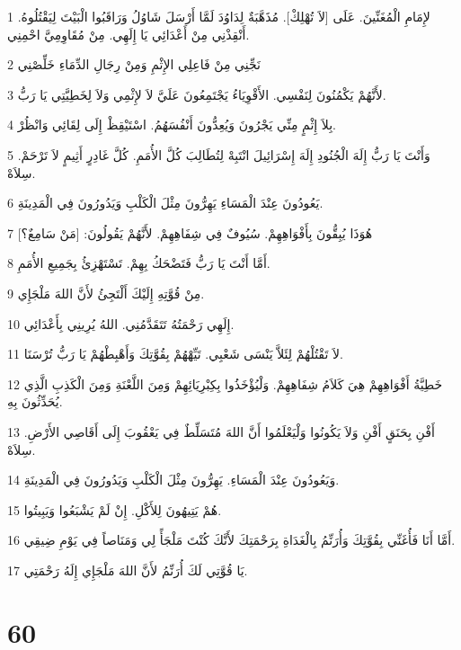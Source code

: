 \par 1 لإِمَامِ الْمُغَنِّينَ. عَلَى [لاَ تُهْلِكْ]. مُذَهَّبَةٌ لِدَاوُدَ لَمَّا أَرْسَلَ شَاوُلُ وَرَاقَبُوا الْبَيْتَ لِيَقْتُلُوهُ. أَنْقِذْنِي مِنْ أَعْدَائِي يَا إِلَهِي. مِنْ مُقَاوِمِيَّ احْمِنِي.
\par 2 نَجِّنِي مِنْ فَاعِلِي الإِثْمِ وَمِنْ رِجَالِ الدِّمَاءِ خَلِّصْنِي
\par 3 لأَنَّهُمْ يَكْمُنُونَ لِنَفْسِي. الأَقْوِيَاءُ يَجْتَمِعُونَ عَلَيَّ لاَ لإِثْمِي وَلاَ لِخَطِيَّتِي يَا رَبُّ.
\par 4 بِلاَ إِثْمٍ مِنِّي يَجْرُونَ وَيُعِدُّونَ أَنْفُسَهُمُ. اسْتَيْقِظْ إِلَى لِقَائِي وَانْظُرْ.
\par 5 وَأَنْتَ يَا رَبُّ إِلَهَ الْجُنُودِ إِلَهَ إِسْرَائِيلَ انْتَبِهْ لِتُطَالِبَ كُلَّ الأُمَمِ. كُلَّ غَادِرٍ أَثِيمٍ لاَ تَرْحَمْ. سِلاَهْ.
\par 6 يَعُودُونَ عِنْدَ الْمَسَاءِ يَهِرُّونَ مِثْلَ الْكَلْبِ وَيَدُورُونَ فِي الْمَدِينَةِ.
\par 7 هُوَذَا يُبِقُّونَ بِأَفْوَاهِهِمْ. سُيُوفٌ فِي شِفَاهِهِمْ. لأَنَّهُمْ يَقُولُونَ: [مَنْ سَامِعٌ؟]
\par 8 أَمَّا أَنْتَ يَا رَبُّ فَتَضْحَكُ بِهِمْ. تَسْتَهْزِئُ بِجَمِيعِ الأُمَمِ.
\par 9 مِنْ قُوَّتِهِ إِلَيْكَ أَلْتَجِئُ لأَنَّ اللهَ مَلْجَإِي.
\par 10 إِلَهِي رَحْمَتُهُ تَتَقَدَّمُنِي. اللهُ يُرِينِي بِأَعْدَائِي.
\par 11 لاَ تَقْتُلْهُمْ لِئَلاَّ يَنْسَى شَعْبِي. تَيِّهْهُمْ بِقُوَّتِكَ وَأَهْبِطْهُمْ يَا رَبُّ تُرْسَنَا.
\par 12 خَطِيَّةُ أَفْوَاهِهِمْ هِيَ كَلاَمُ شِفَاهِهِمْ. وَلْيُؤْخَذُوا بِكِبْرِيَائِهِمْ وَمِنَ اللَّعْنَةِ وَمِنَ الْكَذِبِ الَّذِي يُحَدِّثُونَ بِهِ.
\par 13 أَفْنِ بِحَنَقٍ أَفْنِ وَلاَ يَكُونُوا وَلْيَعْلَمُوا أَنَّ اللهَ مُتَسَلِّطٌ فِي يَعْقُوبَ إِلَى أَقَاصِي الأَرْضِ. سِلاَهْ.
\par 14 وَيَعُودُونَ عِنْدَ الْمَسَاءِ. يَهِرُّونَ مِثْلَ الْكَلْبِ وَيَدُورُونَ فِي الْمَدِينَةِ.
\par 15 هُمْ يَتِيهُونَ لِلأَكْلِ. إِنْ لَمْ يَشْبَعُوا وَيَبِيتُوا.
\par 16 أَمَّا أَنَا فَأُغَنِّي بِقُوَّتِكَ وَأُرَنِّمُ بِالْغَدَاةِ بِرَحْمَتِكَ لأَنَّكَ كُنْتَ مَلْجَأً لِي وَمَنَاصاً فِي يَوْمِ ضِيقِي.
\par 17 يَا قُوَّتِي لَكَ أُرَنِّمُ لأَنَّ اللهَ مَلْجَإِي إِلَهُ رَحْمَتِي.

\chapter{60}

